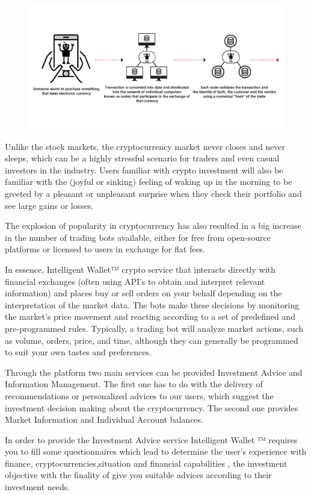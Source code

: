 \documentclass[	DIV=calc,%
							paper=letter,%
							fontsize=12pt%
                            ]{scrartcl}	 					%
\begin{document}
\begin{figure}[H]
\centering
\includegraphics[scale=0.40]{img/Crypto.png}
\caption{ }
\label{Crypto}
\end{figure}

Unlike the stock markets, the cryptocurrency market never closes and never sleeps, which can be a highly stressful scenario for traders and even casual investors in the industry. Users familiar with crypto investment will also be familiar with the (joyful or sinking) feeling of waking up in the morning to be greeted by a pleasant or unpleasant surprise when they check their portfolio and see large gains or losses.

The explosion of popularity in cryptocurrency has also resulted in a big increase in the number of trading bots available, either for free from open-source platforms or licensed to users in exchange for flat fees. 

In essence, Intelligent Wallet™ crypto service that interacts directly with financial exchanges (often using API’s to obtain and interpret relevant information) and places buy or sell orders on your behalf depending on the interpretation of the market data. The bots make these decisions by monitoring the market’s price movement and reacting according to a set of predefined and pre-programmed rules. Typically, a trading bot will analyze market actions, such as volume, orders, price, and time, although they can generally be programmed to suit your own tastes and preferences. 


Through the platform two main services can be provided\: Investment Advice and Information Management. The first one has to do with the delivery of recommendations or personalized advices to our users, which suggest the investment decision making about the cryptocurrency. The second one provides Market Information and Individual Account balances.

In order to provide the Investment Advice service Intelligent Wallet ™ requires you to fill some questionnaires  which lead to determine the user's experience with finance, cryptocurrencies,situation and financial capabilities , the investment objective with the finality of give you suitable advices according to their investment needs.
\end{document}
